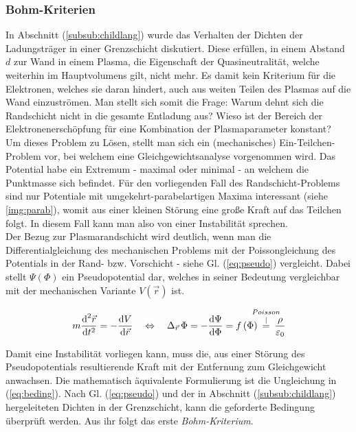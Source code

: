 \documentclass[numbers=noenddot,a4paper]{scrartcl}
\newcommand{\diff}{\textnormal{d}}
\newcommand{\ix}[1]{_\text{#1}}
\newcommand{\tilt}[1]{\textit{#1}}
\begin{document}
		\subsubsection{Bohm-Kriterien}
		
			In Abschnitt (\ref{subsub:childlang}) wurde das Verhalten der Dichten der Ladungstr\"ager in einer Grenzschicht diskutiert. Diese erf\"ullen, in einem Abstand $d$ zur Wand in einem Plasma, die Eigenschaft der Quasineutralit\"at, welche weiterhin im Hauptvolumens gilt, nicht mehr. Es damit kein Kriterium f\"ur die Elektronen, welches sie daran hindert, auch aus weiten Teilen des Plasmas auf die Wand einzustr\"omen. Man stellt sich somit die Frage: Warum dehnt sich die Randschicht nicht in die gesamte Entladung aus? Wieso ist der Bereich der Elektronenersch\"opfung f\"ur eine Kombination der Plasmaparameter konstant? \\
			Um dieses Problem zu L\"osen, stellt man sich ein (mechanisches) Ein-Teilchen-Problem vor, bei welchem eine Gleichgewichtsanalyse vorgenommen wird. Das Potential habe ein Extremum - maximal oder minimal - an welchem die Punktmasse sich befindet. F\"ur den vorliegenden Fall des Randschicht-Problems sind nur Potentiale mit umgekehrt-parabelartigen Maxima interessant (siehe \ref{img:parab}), womit aus einer kleinen St\"orung eine gro{\ss}e Kraft auf das Teilchen folgt. In diesem Fall kann man also von einer Instabilit\"at sprechen.\\
			Der Bezug zur Plasmarandschicht wird deutlich, wenn man die Differentialgleichung des mechanischen Problems mit der Poissongleichung des Potentials in der Rand- bzw. Vorschicht - siehe Gl. (\ref{eq:pseudo}) vergleicht. Dabei stellt $\Psi\left(\Phi\right)$ ein Pseudopotential dar, welches in seiner Bedeutung vergleichbar mit der mechanischen Variante $V\left(\vec{r}\right)$ ist.
			
				\begin{align}
					m\frac{\diff^{2}\vec{r}}{\diff t^{2}}=-\frac{\diff V}{\diff\vec{r}} \quad \Leftrightarrow \quad \Delta_{\vec{r}}\,\Phi=-\frac{\diff\Psi}{\diff\Phi}=f\left(\Phi\right)\hspace{-0.3cm}\overset{Poisson}{\overset{\mid}{=}}\hspace{-0.3cm}\frac{\rho}{\varepsilon\ix{0}} \label{eq:pseudo}
				\end{align}
				
			Damit eine Instabilit\"at vorliegen kann, muss die, aus einer St\"orung des Pseudopotentials resultierende Kraft mit der Entfernung zum Gleichgewicht anwachsen. Die mathematisch \"aquivalente Formulierung ist die Ungleichung  in (\ref{eq:beding}). Nach Gl. (\ref{eq:pseudo}) und der in Abschnitt (\ref{subsub:childlang}) hergeleiteten Dichten in der Grenzschicht, kann die geforderte Bedingung \"uberpr\"uft werden. Aus ihr folgt das erste \tilt{Bohm-Kriterium}.
			
\end{document}

